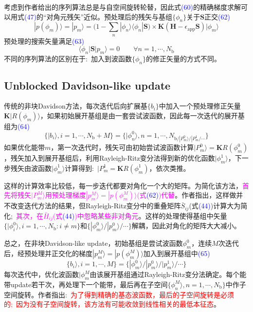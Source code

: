 \documentclass[14pt]{article}      %
\begin{document}
考虑到作者给出的序列算法总是与自空间旋转轮替，因此式\textcolor{blue}{(60)}的精确梯度求解可以用式\textcolor{blue}{(47)}的“对角元残矢”近似。预处理后的残矢与基组$\{\phi_n\}$关于$\mathbf{S}$正交\textcolor{blue}{(62)}
\begin{displaymath}
	|p(\phi_m)\rangle=|p_m\rangle=\bigg(1-\sum_n|\phi_n\rangle\langle\phi_n|\mathbf{S}\bigg)\times\mathbf{K}(\mathbf{H}-\epsilon_{\mathrm{app}}\mathbf{S})|\phi_m\rangle
\end{displaymath}
预处理的搜索矢量满足\textcolor{blue}{(63)}
\begin{displaymath}
	\langle\phi_n|\mathbf{S}|p_m\rangle=0\qquad\forall n=1,\cdots,N_{\mathrm{b}}
\end{displaymath}
不同的序列算法的区别在于:~加入到波函数$\{\phi_n\}$的修正矢量的方式不同。

\subsection{Unblocked Davidson-like update}
传统的非块\textrm{Davidson}方法，每次迭代后向扩展基$\{b_i\}$中加入一个预处理修正矢量$\mathbf{K}|R(\phi_m)\rangle$，如果初始展开基组是由一套尝试波函数，因此每一次迭代的展开基组为\textcolor{blue}{(64)}
\begin{displaymath}
	\{|b_i\rangle,i=1,\cdots,N_{\mathrm{b}}+M\}=\{|\phi_n^0\rangle,n=1,\cdots,N_{\mathrm{b}/|P_m^0\rangle/|P_m^1/\cdots}\}
\end{displaymath}
如果优化能带$m$，第一次迭代时，残矢可由初始尝试波函数计算$|P_m^0\rangle=\mathbf{K}R(\phi_m^0)$，残矢加入到展开基组后，利用\textrm{Rayleigh-Ritz}变分法得到新的优化函数$|\phi_m^1\rangle$，下一步残矢由波函数$|\phi_m^1\rangle$计算得到:~$|P_m^1=\mathbf{K}R(\phi_m^1)$，依次类推。

这样的计算效率比较低，每一步迭代都要对角化一个大的矩阵。为简化该方法，\textcolor{magenta}{首先将残矢$|P_m^M\rangle$用预处理梯度$|p_m^M\rangle=|p(\phi_m^M)\rangle$(式\textcolor{blue}{(62)})代替}。作者指出，这样做并不改变迭代方法的结果，但\textrm{Rayleigh-Ritz}变分中的重叠矩阵$\bar{S}_{ij}$(式\textcolor{blue}{(44)})计算大为简化;~\textcolor{magenta}{其次，在$\bar{H}_{ij}$(式\textcolor{blue}{(44)})中忽略某些非对角元}。这样的处理使得基组中矢量$\{|\phi_i^0\rangle,i=1,\cdots,N_{\mathrm{b}}:i\ne m\}$和$\{|\phi_m^0\rangle/|p_m^0\rangle/\cdots\}$解耦，因此对角化的矩阵大大减小。

总之，在非块\textrm{Davidson-like update}，初始基组是尝试波函数$\phi_m^0$，连续$M$次迭代后，经预处理并正交化的梯度$|p_m^M\rangle=|p(\phi_m^M)\rangle$加入到展开基组中\textcolor{blue}{(65)}
\begin{displaymath}
	\{b_i\rangle,i=1,\cdots,M\}=\{|\phi_m^0\rangle/|p_m^0\rangle/|p_m^1\rangle/\cdots\}
\end{displaymath}
每次迭代中，优化波函数$|\phi_m^M$由该展开基组通过\textrm{Rayleigh-Ritz}变分法确定。每个能带\textrm{update}若干次，再处理下一个能带，最后再在子空间$\{\phi_n^M\rangle,n=1,\cdots,N_{\mathrm{b}}\}$中作子空间旋转。作者指出:~\textcolor{red}{为了得到精确的基态波函数，最后的子空间旋转是必须的;~因为没有子空间旋转，该方法有可能收敛到线性相关的最低本征态}。
\end{document}
